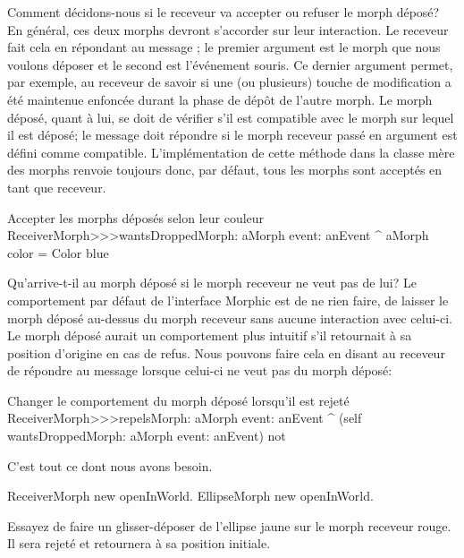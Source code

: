 \documentclass[a4paper,10pt,twoside]{book}
\begin{document}
Comment d\'ecidons-nous si le receveur va accepter ou refuser le morph
d\'epos\'e? En g\'en\'eral, ces deux morphs devront s'accorder sur
leur interaction. Le receveur fait cela en r\'epondant au message
 ; le premier argument est le
 morph que nous voulons d\'eposer et le second est l'\'ev\'enement
 souris. Ce dernier argument permet, par exemple, au receveur de
 savoir si une (ou plusieurs) touche de modification a \'et\'e
 maintenue enfonc\'ee durant la phase de d\'ep\^ot de l'autre morph.
Le morph d\'epos\'e, quant \`a lui, se doit de v\'erifier s'il est
compatible avec le morph sur lequel il est d\'epos\'e; le message
 doit r\'epondre  si le morph
receveur 
pass\'e en argument est d\'efini comme compatible. L'impl\'ementation
de cette m\'ethode dans la classe m\`ere des morphs  renvoie
toujours  
donc, par d\'efaut, tous les morphs sont accept\'es en tant que
receveur.

\begin{method}{Accepter les morphs d\'epos\'es selon leur couleur}
ReceiverMorph>>>wantsDroppedMorph: aMorph event: anEvent
	^ aMorph color = Color blue
\end{method}

Qu'arrive-t-il au morph d\'epos\'e si le morph receveur ne veut pas de lui?
Le comportement par d\'efaut de l'interface Morphic est de ne rien
faire, \cad de laisser le morph d\'epos\'e au-dessus du morph receveur
sans aucune interaction avec celui-ci. 
Le morph d\'epos\'e aurait un comportement plus intuitif s'il
retournait \`a sa position d'origine en cas de refus.
Nous pouvons faire cela en disant au receveur de r\'epondre 
au message   lorsque celui-ci ne
veut pas du morph d\'epos\'e:

\begin{method}{Changer le comportement du morph d\'epos\'e lorsqu'il est rejet\'e}
ReceiverMorph>>>repelsMorph: aMorph event: anEvent
	^ (self wantsDroppedMorph: aMorph event: anEvent) not
\end{method}

C'est tout ce dont nous avons besoin.

\begin{code}{}
ReceiverMorph new openInWorld.
EllipseMorph new openInWorld.
\end{code}
\noindent
Essayez de faire un glisser-d\'eposer de l'ellipse jaune
 sur le morph receveur rouge. Il sera rejet\'e et
retournera \`a sa position initiale.
\end{document}
